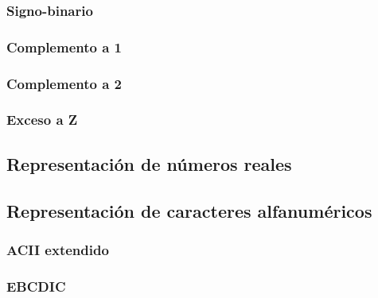 \documentclass[a4paper, 11pt, titlepage]{article}
\begin{document}
        \subsubsection{Signo-binario}

        \subsubsection{Complemento a 1}

        \subsubsection{Complemento a 2}

        \subsubsection{Exceso a Z}

    \subsection{Representación de números reales}

    \subsection{Representación de caracteres alfanuméricos}

        \subsubsection{ACII extendido}

        \subsubsection{EBCDIC}
\end{document}

